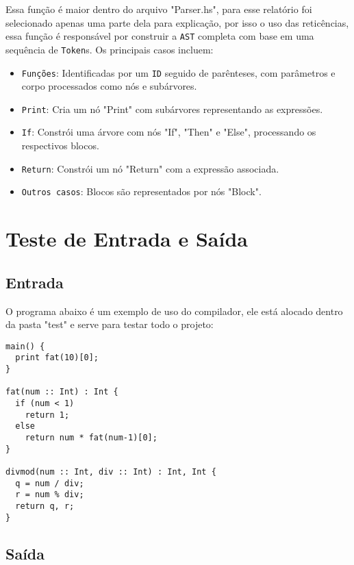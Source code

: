 \documentclass{article}
\begin{document}
Essa função é maior dentro do arquivo "Parser.hs", para esse relatório foi selecionado apenas uma parte dela para explicação, por isso o uso das reticências, essa função é responsável por construir a \texttt{AST} completa com base em uma sequência de \texttt{Token}s. Os principais casos incluem:
\begin{itemize}
    \item \texttt{Funções}: Identificadas por um \texttt{ID} seguido de parênteses, com parâmetros e corpo processados como nós e subárvores.
    \item \texttt{Print}: Cria um nó "Print" com subárvores representando as expressões.
    \item \texttt{If}: Constrói uma árvore com nós "If", "Then" e "Else", processando os respectivos blocos.
    \item \texttt{Return}: Constrói um nó "Return" com a expressão associada.
    \item \texttt{Outros casos}: Blocos são representados por nós "Block".
\end{itemize}


\section{Teste de Entrada e Saída}
\subsection{Entrada}
O programa abaixo é um exemplo de uso do compilador, ele está alocado dentro da pasta "test" e serve para testar todo o projeto:


\begin{verbatim}
main() {
  print fat(10)[0];
}

fat(num :: Int) : Int {
  if (num < 1)
    return 1;
  else
    return num * fat(num-1)[0];
}

divmod(num :: Int, div :: Int) : Int, Int {
  q = num / div;
  r = num % div;
  return q, r;
}
\end{verbatim}

\subsection{Saída}
\end{document}
